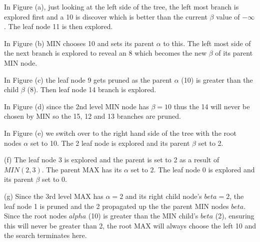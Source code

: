 \documentclass[a4paper,12pt]{article}
\begin{document}
In Figure (a), just looking at the left side of the tree, the left most branch is explored first and a 10 is discover which is better than the current $\beta$ value of $-\infty$. The leaf node 11 is then explored.

In Figure (b) MIN chooses 10 and sets its parent $\alpha$ to this. The left most side of the next branch is explored to reveal an 8 which becomes the new $\beta$ of its parent MIN node. 

In Figure (c) the leaf node 9 gets pruned as the parent $\alpha$ (10) is greater than the child $\beta$ (8). Then leaf node 14 branch is explored.

In Figure (d) since the 2nd level MIN node has $\beta = 10$ thus the 14 will never be chosen by MIN so the 15, 12 and 13 branches are pruned.

In Figure (e) we switch over to the right hand side of the tree with the root nodes $\alpha$ set to 10. The 2 leaf node is explored  and its parent $\beta$ set to 2.

(f) The leaf node 3 is explored and the parent is set to 2 as a result of $MIN(2, 3)$. The parent MAX has its $\alpha$ set to 2. The leaf node 0 is explored and its parent $\beta$ set to 0.

(g) Since the 3rd level MAX has $\alpha = 2$ and its right child node's $beta = 2$, the leaf node 1 is pruned and the 2 propagated up the the parent MIN nodes $beta$. Since the root nodes $alpha$ (10) is greater than the MIN child's $beta$ (2), ensuring this will never be greater than 2, the root MAX will always choose the left 10 and the search terminates here.
\end{document}
